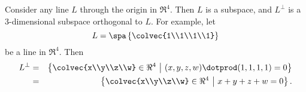 \begin{example}
Consider any line \(L\) through the origin in \(\Re^4\). Then \(L\) is a subspace, and \(L^\perp\) is a \(3\)-dimensional subspace orthogonal to \(L\). For example, let 
\[L=\spa \left\{ \colvec{1\\1\\1\\1} \right\}\] 
be a line in \(\Re^4.\) Then 
\begin{eqnarray*}
L^\perp&=&\left \{  \colvec{x\\y\\z\\w} \in \Re^4 ~\middle| ~ (x,y,z,w) \dotprod (1,1,1,1)=0 \right\} \\
&=&\left\{ \colvec{x\\y\\z\\w} \in \Re^4 ~\middle| ~ x+y+z+w=0 \right \}.
\end{eqnarray*}


\end{example}
